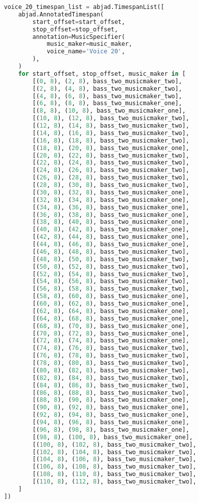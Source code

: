 \begin{lstlisting}[language=Python, caption=Invocation Source Code]
voice_20_timespan_list = abjad.TimespanList([
    abjad.AnnotatedTimespan(
        start_offset=start_offset,
        stop_offset=stop_offset,
        annotation=MusicSpecifier(
            music_maker=music_maker,
            voice_name='Voice 20',
        ),
    )
    for start_offset, stop_offset, music_maker in [
        [(0, 8), (2, 8), bass_two_musicmaker_two],
        [(2, 8), (4, 8), bass_two_musicmaker_two],
        [(4, 8), (6, 8), bass_two_musicmaker_two],
        [(6, 8), (8, 8), bass_two_musicmaker_one],
        [(8, 8), (10, 8), bass_two_musicmaker_one],
        [(10, 8), (12, 8), bass_two_musicmaker_two],
        [(12, 8), (14, 8), bass_two_musicmaker_two],
        [(14, 8), (16, 8), bass_two_musicmaker_two],
        [(16, 8), (18, 8), bass_two_musicmaker_two],
        [(18, 8), (20, 8), bass_two_musicmaker_one],
        [(20, 8), (22, 8), bass_two_musicmaker_two],
        [(22, 8), (24, 8), bass_two_musicmaker_two],
        [(24, 8), (26, 8), bass_two_musicmaker_two],
        [(26, 8), (28, 8), bass_two_musicmaker_two],
        [(28, 8), (30, 8), bass_two_musicmaker_two],
        [(30, 8), (32, 8), bass_two_musicmaker_one],
        [(32, 8), (34, 8), bass_two_musicmaker_one],
        [(34, 8), (36, 8), bass_two_musicmaker_one],
        [(36, 8), (38, 8), bass_two_musicmaker_one],
        [(38, 8), (40, 8), bass_two_musicmaker_one],
        [(40, 8), (42, 8), bass_two_musicmaker_one],
        [(42, 8), (44, 8), bass_two_musicmaker_one],
        [(44, 8), (46, 8), bass_two_musicmaker_one],
        [(46, 8), (48, 8), bass_two_musicmaker_two],
        [(48, 8), (50, 8), bass_two_musicmaker_two],
        [(50, 8), (52, 8), bass_two_musicmaker_two],
        [(52, 8), (54, 8), bass_two_musicmaker_two],
        [(54, 8), (56, 8), bass_two_musicmaker_two],
        [(56, 8), (58, 8), bass_two_musicmaker_two],
        [(58, 8), (60, 8), bass_two_musicmaker_one],
        [(60, 8), (62, 8), bass_two_musicmaker_one],
        [(62, 8), (64, 8), bass_two_musicmaker_one],
        [(64, 8), (68, 8), bass_two_musicmaker_one],
        [(68, 8), (70, 8), bass_two_musicmaker_one],
        [(70, 8), (72, 8), bass_two_musicmaker_one],
        [(72, 8), (74, 8), bass_two_musicmaker_one],
        [(74, 8), (76, 8), bass_two_musicmaker_two],
        [(76, 8), (78, 8), bass_two_musicmaker_two],
        [(78, 8), (80, 8), bass_two_musicmaker_two],
        [(80, 8), (82, 8), bass_two_musicmaker_two],
        [(82, 8), (84, 8), bass_two_musicmaker_two],
        [(84, 8), (86, 8), bass_two_musicmaker_two],
        [(86, 8), (88, 8), bass_two_musicmaker_two],
        [(88, 8), (90, 8), bass_two_musicmaker_one],
        [(90, 8), (92, 8), bass_two_musicmaker_one],
        [(92, 8), (94, 8), bass_two_musicmaker_one],
        [(94, 8), (96, 8), bass_two_musicmaker_one],
        [(96, 8), (98, 8), bass_two_musicmaker_one],
        [(98, 8), (100, 8), bass_two_musicmaker_one],
        [(100, 8), (102, 8), bass_two_musicmaker_two],
        [(102, 8), (104, 8), bass_two_musicmaker_two],
        [(104, 8), (106, 8), bass_two_musicmaker_two],
        [(106, 8), (108, 8), bass_two_musicmaker_two],
        [(108, 8), (110, 8), bass_two_musicmaker_two],
        [(110, 8), (112, 8), bass_two_musicmaker_two],
    ]
])


\end{lstlisting}
